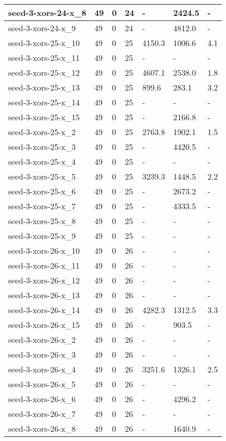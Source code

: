 \begin{scriptsize}
\begin{longtable}{|p{5cm}|l|l|l|l|l|l|}
seed-3-xors-24-x\_8&49&0&24&-&2424.5&- \\ \hline 
seed-3-xors-24-x\_9&49&0&24&-&4812.0&- \\ \hline 
seed-3-xors-25-x\_10&49&0&25&4150.3&1006.6&4.1 \\ \hline 
seed-3-xors-25-x\_11&49&0&25&-&-&- \\ \hline 
seed-3-xors-25-x\_12&49&0&25&4607.1&2538.0&1.8 \\ \hline 
seed-3-xors-25-x\_13&49&0&25&899.6&283.1&3.2 \\ \hline 
seed-3-xors-25-x\_14&49&0&25&-&-&- \\ \hline 
seed-3-xors-25-x\_15&49&0&25&-&2166.8&- \\ \hline 
seed-3-xors-25-x\_2&49&0&25&2763.8&1902.1&1.5 \\ \hline 
seed-3-xors-25-x\_3&49&0&25&-&4420.5&- \\ \hline 
seed-3-xors-25-x\_4&49&0&25&-&-&- \\ \hline 
seed-3-xors-25-x\_5&49&0&25&3239.3&1448.5&2.2 \\ \hline 
seed-3-xors-25-x\_6&49&0&25&-&2673.2&- \\ \hline 
seed-3-xors-25-x\_7&49&0&25&-&4333.5&- \\ \hline 
seed-3-xors-25-x\_8&49&0&25&-&-&- \\ \hline 
seed-3-xors-25-x\_9&49&0&25&-&-&- \\ \hline 
seed-3-xors-26-x\_10&49&0&26&-&-&- \\ \hline 
seed-3-xors-26-x\_11&49&0&26&-&-&- \\ \hline 
seed-3-xors-26-x\_12&49&0&26&-&-&- \\ \hline 
seed-3-xors-26-x\_13&49&0&26&-&-&- \\ \hline 
seed-3-xors-26-x\_14&49&0&26&4282.3&1312.5&3.3 \\ \hline 
seed-3-xors-26-x\_15&49&0&26&-&903.5&- \\ \hline 
seed-3-xors-26-x\_2&49&0&26&-&-&- \\ \hline 
seed-3-xors-26-x\_3&49&0&26&-&-&- \\ \hline 
seed-3-xors-26-x\_4&49&0&26&3251.6&1326.1&2.5 \\ \hline 
seed-3-xors-26-x\_5&49&0&26&-&-&- \\ \hline 
seed-3-xors-26-x\_6&49&0&26&-&4296.2&- \\ \hline 
seed-3-xors-26-x\_7&49&0&26&-&-&- \\ \hline 
seed-3-xors-26-x\_8&49&0&26&-&1640.9&- \\ \hline 

\end{longtable}
\end{scriptsize}
